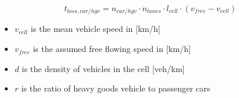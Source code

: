 \begin{equation}
	t_{loss,car/hgv} = n_{car/hgv} \cdot n_{lanes} \cdot l_{cell} \cdot ( v_{free} - v_{cell})
	\label{equation_timeloss}
\end{equation}
\begin{itemize}
	\setlength\itemsep{0.01em}	
	\item[] $v_{cell}$ is the mean vehicle speed in [km/h]
	\item[] $v_{free}$ is the assumed free flowing speed in [km/h]
	\item[] $d$ is the density of vehicles in the cell [veh/km]
	\item[] $r$ is the ratio of heavy goods vehicle to passenger cars 
\end{itemize}

\bigskip

